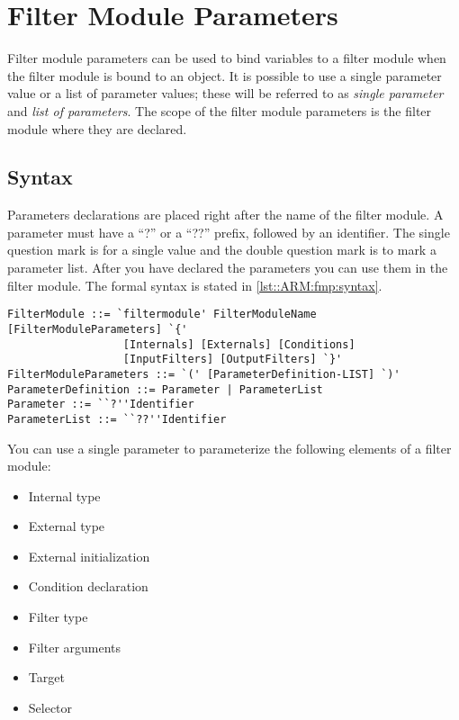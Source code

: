 \chapter{Filter Module Parameters}
Filter module parameters can be used to bind variables to a filter module
when the filter module is bound to an object.
It is possible to use a single parameter value or a list of parameter values; these
will be referred to as \emph{single parameter} and \emph{list of parameters}.
The scope of the filter module parameters is the filter module where
they are declared.

\section*{Syntax}
Parameters declarations are placed right after the name of the
filter module. A parameter must have a ``?'' or a ``??'' prefix, followed
by an identifier.
The single question mark is for a single value and the double question mark is to mark
a parameter list.
After you have declared the parameters you can use them in
the filter module. The formal syntax is stated in \autoref{lst::ARM:fmp:syntax}.

\begin{lstlisting}[caption = {Parameter declaration syntax}, label = lst::ARM:fmp:syntax,
style = listing, language = ebnf, float = tpb]
FilterModule ::= `filtermodule' FilterModuleName [FilterModuleParameters] `{'
                  [Internals] [Externals] [Conditions]
                  [InputFilters] [OutputFilters] `}'
FilterModuleParameters ::= `(' [ParameterDefinition-LIST] `)'
ParameterDefinition ::= Parameter | ParameterList
Parameter ::= ``?''Identifier
ParameterList ::= ``??''Identifier
\end{lstlisting}

You can use a single parameter to parameterize the following elements of a filter module:%
\begin{itemize}[noitemsep]
\item Internal type
\item External type
\item External initialization
\item Condition declaration
\item Filter type
\item Filter arguments
\item Target
\item Selector
\end{itemize}

